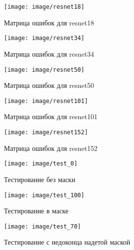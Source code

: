 \documentclass[a4paper,14pt]{article}
\begin{document}
	
	\begin{figure}[H]
		\centering
		\texttt{[image: image/resnet18]}
		\caption{Матрица ошибок для resnet18}
		\label{fig:resnet18}
	\end{figure}
	
	\begin{figure}[H]
		\centering
		\texttt{[image: image/resnet34]}
		\caption{Матрица ошибок для resnet34}
		\label{fig:resnet34}
	\end{figure}
	
	\begin{figure}[H]
		\centering
		\texttt{[image: image/resnet50]}
		\caption{Матрица ошибок для resnet50}
		\label{fig:resnet50}
	\end{figure}
	
	\begin{figure}[H]
		\centering
		\texttt{[image: image/resnet101]}
		\caption{Матрица ошибок для resnet101}
		\label{fig:resnet101}
	\end{figure}
	
	\begin{figure}[H]
		\centering
		\texttt{[image: image/resnet152]}
		\caption{Матрица ошибок для resnet152}
		\label{fig:resnet152}
	\end{figure}
	
	\begin{figure}[H]
		\centering
		\texttt{[image: image/test\_0]}
		\caption{Тестирование без маски}
		\label{fig:test0}
	\end{figure}
	
	\begin{figure}[H]
		\centering
		\texttt{[image: image/test\_100]}
		\caption{Тестирование в маске}
		\label{fig:test100}
	\end{figure}
	
	\begin{figure}[H]
		\centering
		\texttt{[image: image/test\_70]}
		\caption{Тестирование с недоконца надетой маской}
		\label{fig:test70}
	\end{figure}
	
	
	
\end{document}
